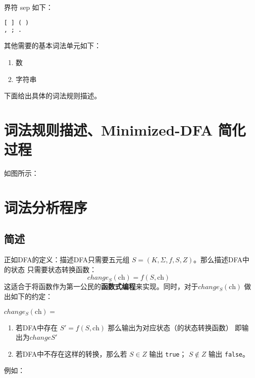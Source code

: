 \documentclass[lang=cn]{elegantpaper}
\begin{document}
界符 sep 如下：
\begin{lstlisting}[language=pascal]
[ ] ( )
, ; .
\end{lstlisting}

其他需要的基本词法单元如下：
\begin{enumerate}
    \item 数
    \item 字符串
\end{enumerate}

下面给出具体的词法规则描述。

\section{词法规则描述、Minimized-DFA 简化过程}

如图所示：


\section{词法分析程序}


\subsection{简述}

正如DFA的定义：描述DFA只需要五元组 $S = (K, \Sigma, f, S, Z)$。那么描述DFA中的状态
只需要状态转换函数：
$$
change_{S}(\mathrm{ch}) = f( S, \mathrm{ch})
$$
这适合于将函数作为第一公民的{\textbf{函数式编程}}来实现。同时，对于$change_S(\mathrm{ch})$
做出如下的约定：

\noindent $change_{S} (\mathrm {ch}) = $
\begin{enumerate}
    \item 若DFA中存在 $S' = f (S, \mathrm{ch})$ 那么输出为对应状态（的状态转换函数）
          即输出为$change{S'}$
    \item 若DFA中不存在这样的转换，那么若
        \subitem $S \in Z$ 输出 \lstinline|true|；
        \subitem $S \notin Z$ 输出 \lstinline|false|。
\end{enumerate}

例如：
\end{document}
